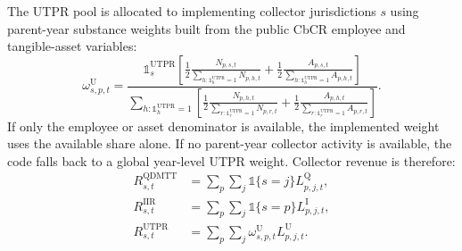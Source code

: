 \documentclass[11pt,a4paper]{article}
\begin{document}
The UTPR pool is  allocated to implementing collector jurisdictions $s$ using parent-year substance weights built from the public CbCR employee and tangible-asset variables:
\begin{equation}\label{eq:utpr_weight}
\omega_{s,p,t}^{\text{U}}
=
\frac{
\mathbb{1}_s^{\text{UTPR}}
\left[
\tfrac{1}{2}\frac{N_{p,s,t}}{\sum_{h:\mathbb{1}_h^{\text{UTPR}}=1}N_{p,h,t}}
+
\tfrac{1}{2}\frac{A_{p,s,t}}{\sum_{h:\mathbb{1}_h^{\text{UTPR}}=1}A_{p,h,t}}
\right]
}{
\sum_{h:\mathbb{1}_h^{\text{UTPR}}=1}
\left[
\tfrac{1}{2}\frac{N_{p,h,t}}{\sum_{r:\mathbb{1}_r^{\text{UTPR}}=1}N_{p,r,t}}
+
\tfrac{1}{2}\frac{A_{p,h,t}}{\sum_{r:\mathbb{1}_r^{\text{UTPR}}=1}A_{p,r,t}}
\right]
}.
\end{equation}
If only the employee or asset denominator is available, the implemented weight uses the available share alone. If no parent-year collector activity is available, the code falls back to a global year-level UTPR weight. Collector revenue is therefore:
\begin{align}
R_{s,t}^{\text{QDMTT}} &= \sum_p \sum_j \mathbb{1}\{s=j\}L_{p,j,t}^{\text{Q}}, \\
R_{s,t}^{\text{IIR}} &= \sum_p \sum_j \mathbb{1}\{s=p\}L_{p,j,t}^{\text{I}}, \\
R_{s,t}^{\text{UTPR}} &= \sum_p \sum_j \omega_{s,p,t}^{\text{U}}L_{p,j,t}^{\text{U}}.
\end{align}
\end{document}
